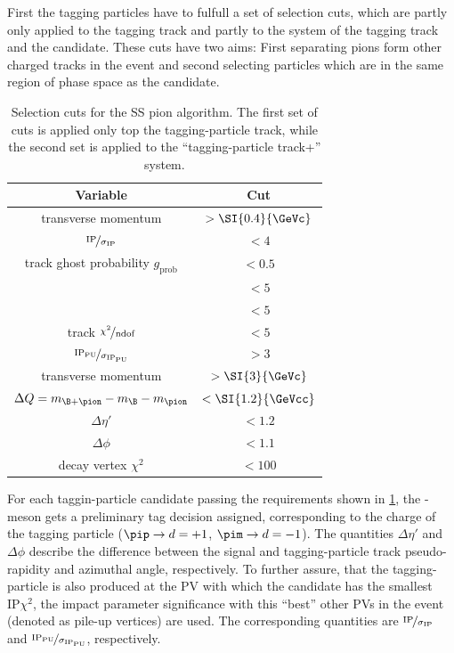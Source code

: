First the tagging particles have to fulfull a set of selection cuts, which are partly only applied to the tagging track and partly to the system of the tagging track and the \B candidate. These cuts have two aims:
First separating pions form other charged tracks in the event and second selecting particles which are in the same region of phase space as the \B candidate.
\begin{table}[tbp]
	\centering
	\caption{Selection cuts for the SS pion algorithm. The first set of cuts is applied only top the tagging-particle track, while the second set is applied to the \enquote{tagging-particle track+\B} system.}
	\begin{tabular}{cc}
		\toprule
		Variable & Cut \\
		\midrule
		transverse momentum \pt 											& $>\SI{0.4}{\GeVc}$ \\
		$\nicefrac{\text{IP}}{\sigma_{\text{IP}}}$							& $<4$ \\
		track ghost probability $g_{\text{prob}}$ 							& $<0.5$ \\
		\dllppi 															& $<5$ \\
		\dllkpi 															& $<5$ \\
		track $\nicefrac{\chi^2}{\text{ndof}}$ 								& $<5$ \\
		$\nicefrac{\text{IP}_{\text{PU}}}{\sigma_{\text{IP}_{\text{PU}}}}$ 	& $>3$ \\
		\midrule
		transverse momentum \pt 					& $>\SI{3}{\GeVc}$ \\
		$\Delta Q=m_{\B+\pion}-m_{\B}-m_{\pion}$ 	& $<\SI{1.2}{\GeVcc}$ \\
		$\Delta\eta'$								& $<1.2$ \\
		$\Delta\phi$								& $<1.1$ \\
		\B decay vertex $\chi^2$ 					& $<100$ \\
		\bottomrule
	\end{tabular}
	\label{tab:SSPionselectionCuts}
\end{table}
For each taggin-particle candidate passing the requirements shown in \cref{tab:SSPionselectionCuts}, the \B-meson gets a preliminary tag decision assigned, corresponding to the charge of the tagging particle ($\pip\rightarrow d=+1$, $\pim\rightarrow d=-1$).
The quantities $\Delta\eta'$ and $\Delta\phi$ describe the difference between the signal and tagging-particle track pseudo-rapidity and azimuthal angle, respectively.
To further assure, that the tagging-particle is also produced at the \ac{PV} with which the \B candidate has the smallest $\text{IP}\chi^2$, the impact parameter significance with this \enquote{best} other PVs in the event (denoted as pile-up vertices) are used.
The corresponding quantities are $\nicefrac{\text{IP}}{\sigma_{\text{IP}}}$ and $\nicefrac{\text{IP}_{\text{PU}}}{\sigma_{\text{IP}_{\text{PU}}}}$, respectively.

